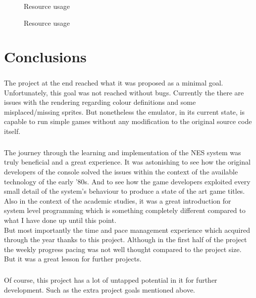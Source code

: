 \documentclass[]{report}
\begin{document}
 \begin{figure}[!htb]
	\caption{\label{fig:my-label} Resource usage}
\end{figure}
\begin{figure}[!htb]
	\caption{\label{fig:my-label} Resource usage}
\end{figure}
\clearpage

\chapter{Conclusions}
\paragraph{ }
The project at the end reached what it was proposed as a minimal goal. Unfortunately, this goal was not reached without bugs. Currently the there are issues with the rendering regarding colour definitions and some misplaced/missing sprites. But nonetheless the emulator, in its current state, is capable to run simple games without any modification to the original source code itself.

\paragraph{ }
The journey through the learning and implementation of the NES system was truly beneficial and a great experience. It was astonishing to see how the original developers of the console solved the issues within the context of the available technology of the early '80s. And to see how the game developers exploited every small detail of the system's behaviour to produce a state of the art game titles. Also in the context of the academic studies, it was a great introduction for system level programming which is something completely different compared to what I have done up until this point.
\\
But most importantly the time and pace management experience which acquired through the year thanks to this project. Although in the first half of the project the weekly progress pacing was not well thought compared to the project size. But it was a great lesson for further projects. 

\paragraph{ }
Of course, this project has a lot of untapped potential in it for further development. Such as the extra project goals mentioned above.

\printbibliography
\end{document}
